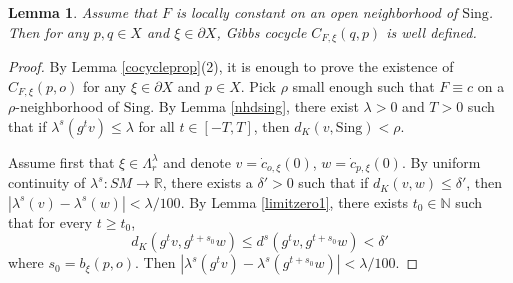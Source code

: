 \documentclass[11pt]{amsart}
\newtheorem{lemma}[theorem]{Lemma}
\theoremstyle{definition}
\def\pX{{\partial X}}
\def\RR{{\mathbb R}}
\def\NN{{\mathbb N}}
\def\d{\delta}   %
\def\l{\lambda}   \def\L{\Lambda}
\begin{document}
\begin{lemma}\label{cocyle2}
Assume that $F$ is locally constant on an open neighborhood of $\text{Sing}$. Then for any $p, q\in X$ and $\xi\in \pX$, Gibbs cocycle $C_{F,\xi}(q,p)$ is well defined.
\end{lemma}
\begin{proof}
By Lemma \ref{cocycleprop}(2), it is enough to prove the existence of $C_{F,\xi}(p,o)$ for any $\xi\in \pX$ and $p\in X$. Pick $\rho$ small enough such that $F\equiv c$ on a $\rho$-neighborhood of $\text{Sing}$. By Lemma \ref{nhdsing}, there exist $\l>0$ and $T>0$ such that if $\l^s(g^tv)\le \l$ for all $t\in [-T,T]$, then $d_K(v, \text{Sing})<\rho$.

Assume first that $\xi\in \L_r^\l$ and denote $v=\dot c_{o,\xi}(0)$, $w=\dot c_{p,\xi}(0)$. 
By uniform continuity of $\l^s:SM\to \RR$, there exists a $\d'>0$ such that if $d_K(v,w)\le \d'$, then $|\l^s(v)-\l^s(w)|<\l/100$. By Lemma \ref{limitzero1}, there exists $t_0\in \NN$ such that for every $t\ge t_0$, 
$$d_K(g^{t}v, g^{t+s_0}w)\le d^s(g^{t}v, g^{t+s_0}w)<\d'$$
where $s_0=b_\xi(p, o)$. Then $|\l^s(g^{t}v)-\l^s(g^{t+s_0}w)|<\l/100.$


\end{proof}
\end{document}
